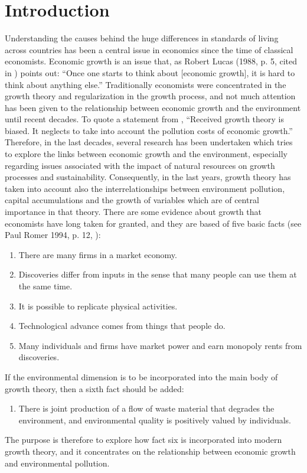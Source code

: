 \section{Introduction}\label{sec:introduction} 
Understanding the causes behind the huge differences in standards of living across countries has been a central issue in economics since the time of classical economists. Economic growth is an issue that, as Robert Lucas (1988, p. 5, cited in \cite{maler_chapter_2005}) points out: “Once one starts to think about [economic growth], it is hard to think about anything else.” 
Traditionally economists were concentrated in the growth theory and regularization in the growth process, and not much attention has been given to the relationship between economic growth and the environment until recent decades. To quote a statement from \cite{maler_chapter_2005}, “Received growth theory is biased. It neglects to take into account
the pollution costs of economic growth.” Therefore, in the last decades, several research has been undertaken which tries to explore the links between economic growth and the environment, especially regarding issues associated with the impact of natural resources on growth processes and sustainability. Consequently, in the last years, growth theory has taken into account also the interrelationships between environment pollution, capital accumulations and the growth of variables which are of central importance in that theory. There are some evidence about growth that economists have long taken for granted, and they are based of five basic facts (see Paul Romer 1994, p. 12, \cite{romer_origins_1994}): 
\begin{enumerate}
    \item There are many firms in a market economy.
    \item Discoveries differ from inputs in the sense that many people can use them at the
    same time.
    \item It is possible to replicate physical activities.
    \item Technological advance comes from things that people do.
    \item Many individuals and firms have market power and earn monopoly rents from discoveries.
\end{enumerate}
If the environmental dimension is to be incorporated into the main body of growth
theory, then a sixth fact should be added:
\begin{enumerate}[resume]
	\item There is joint production of a flow of waste material that degrades the environment, and environmental quality is positively valued by individuals.
\end{enumerate}
The purpose is therefore to explore how fact six is incorporated into
modern growth theory, and it concentrates on the relationship between economic growth and environmental pollution.

